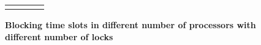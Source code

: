 \begin{figure}[!htb]
  \centering
{
  \setlength{\tabcolsep}{0pt}
\begin{tabular}{cccc}
      \subfigure[$P=4$]{
        \scalebox{0.9}{
          \begin{tikzpicture}
            
          \end{tikzpicture}}
      } &
      \subfigure[$P=8$]{
        \scalebox{0.9}{
          \begin{tikzpicture}
            
          \end{tikzpicture}}
      } &
      \subfigure[$P=16$]{
        \scalebox{0.9}{
          \begin{tikzpicture}
            
          \end{tikzpicture}}
      } &
      \subfigure[$P=64$]{
        \scalebox{0.9}{
          \begin{tikzpicture}
            
          \end{tikzpicture}}
      }    \\
\end{tabular}
  }
  \caption{ {\bf Blocking time slots in different number of processors with different number of locks}}
  \label{fig-blocking}
\end{figure}
